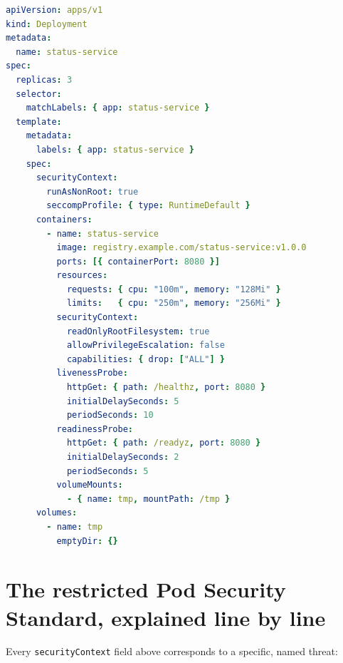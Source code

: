 \documentclass[11pt,twoside,openright]{book}
\begin{document}
\begin{lstlisting}[language=yaml]
apiVersion: apps/v1
kind: Deployment
metadata:
  name: status-service
spec:
  replicas: 3
  selector:
    matchLabels: { app: status-service }
  template:
    metadata:
      labels: { app: status-service }
    spec:
      securityContext:
        runAsNonRoot: true
        seccompProfile: { type: RuntimeDefault }
      containers:
        - name: status-service
          image: registry.example.com/status-service:v1.0.0
          ports: [{ containerPort: 8080 }]
          resources:
            requests: { cpu: "100m", memory: "128Mi" }
            limits:   { cpu: "250m", memory: "256Mi" }
          securityContext:
            readOnlyRootFilesystem: true
            allowPrivilegeEscalation: false
            capabilities: { drop: ["ALL"] }
          livenessProbe:
            httpGet: { path: /healthz, port: 8080 }
            initialDelaySeconds: 5
            periodSeconds: 10
          readinessProbe:
            httpGet: { path: /readyz, port: 8080 }
            initialDelaySeconds: 2
            periodSeconds: 5
          volumeMounts:
            - { name: tmp, mountPath: /tmp }
      volumes:
        - name: tmp
          emptyDir: {}
\end{lstlisting}

\section{The restricted Pod Security Standard, explained line by line}

Every \texttt{securityContext} field above corresponds to a specific, named threat:
\end{document}

